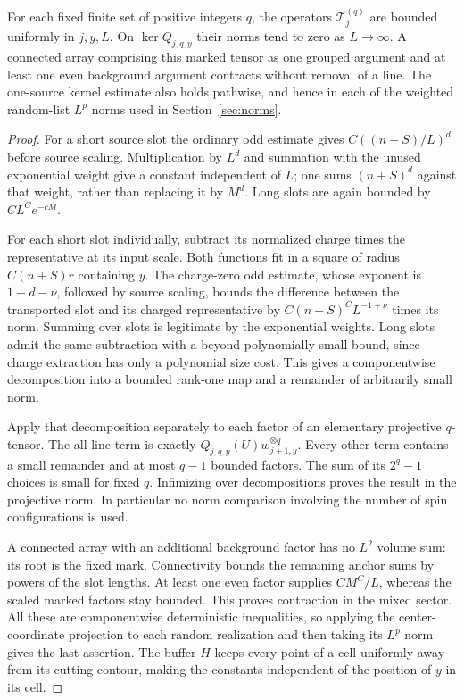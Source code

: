 \begin{proposition}\label{lin:marked}
For each fixed finite set of positive integers $q$, the operators
$\mathcal T_j^{(q)}$ are bounded uniformly in $j,y,L$.  On
$\ker Q_{j,q,y}$ their norms tend to zero as $L\to\infty$.
A connected array comprising this marked tensor as one grouped argument and
at least one even background argument contracts without removal of a line.
The one-source kernel estimate also holds pathwise, and hence in each of the
weighted random-list $L^p$ norms used in Section~\ref{sec:norms}.
\end{proposition}

\begin{proof}
For a short source slot the ordinary odd estimate gives
$C((n+S)/L)^d$ before source scaling.  Multiplication by $L^d$ and summation
with the unused exponential weight give a constant independent of $L$;
one sums $(n+S)^d$ against that weight, rather than replacing it by $M^d$.
Long slots are again bounded by $C L^C e^{-cM}$.

For each short slot individually, subtract its normalized charge times the
representative at its input scale.  Both functions fit in a square of radius
$C(n+S)r$ containing $y$.  The charge-zero odd estimate, whose exponent is
$1+d-\nu$, followed by source scaling, bounds the difference between the
transported slot and its charged representative by
$C(n+S)^C L^{-1+\nu}$ times its norm.  Summing over slots is legitimate by
the exponential weights.  Long slots admit the same subtraction with a
beyond-polynomially small bound, since charge extraction has only a
polynomial size cost.  This gives a componentwise decomposition into a
bounded rank-one map and a remainder of arbitrarily small norm.

Apply that decomposition separately to each factor of an elementary
projective $q$-tensor.  The all-line term is exactly
$Q_{j,q,y}(U)w_{j+1,y}^{\otimes q}$.  Every other term contains a small
remainder and at most $q-1$ bounded factors.  The sum of its $2^q-1$ choices
is small for fixed $q$.  Infimizing over decompositions proves the result
in the projective norm.  In particular no norm comparison involving the
number of spin configurations is used.

A connected array with an additional background factor has no $L^2$ volume
sum: its root is the fixed mark.  Connectivity bounds the remaining anchor
sums by powers of the slot lengths.  At least one even factor supplies
$C M^C/L$, whereas the scaled marked factors stay bounded.  This proves
contraction in the mixed sector.  All these are componentwise deterministic
inequalities, so applying the center-coordinate projection to each random
realization and then taking its $L^p$ norm gives the last assertion.  The
buffer $H$ keeps every point of a cell uniformly away from its cutting
contour, making the constants independent of the position of $y$ in its
cell.
\end{proof}
